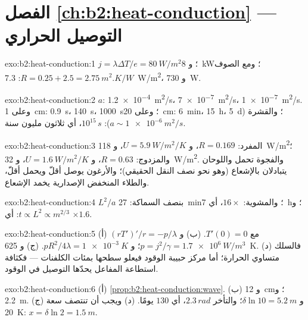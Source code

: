 \section*{الفصل \ref{ch:b2:heat-conduction} --- التوصيل الحراري}

\begin{solution}{exo:b2:heat-conduction:1}
$j = \lambda\Delta T/e = \qty{80}{W/m^2}$؛ و \qty{8}{kW}؛ ومع الصوف $R = 0.25 + 2.5 =
\qty{2.75}{m^2.K/W}$: \qty{7.3}{W/m^2}، و \qty{730}{W}.
\end{solution}

\begin{solution}{exo:b2:heat-conduction:2}
$a$: \qty{1.2e-4}{m^2/s}، \qty{7e-7}{m^2/s}، \qty{1e-7}{m^2/s}. وعلى \qty{1}{cm}:
\qty{0.9}{s}، \qty{140}{s}، \qty{1000}{s}؛ وعلى \qty{20}{cm}: \qty{6}{min}، \qty{15}{h}،
\qty{5}{d}؛ والقشرة ($a \sim \qty{1e-6}{m^2/s}$): $10^{15}\,\unit{s}$، أي ثلاثون
مليون سنة.
\end{solution}

\begin{solution}{exo:b2:heat-conduction:3}
المفرد: $R = 0.169$، و $U = \qty{5.9}{W/m^2/K}$، و \qty{118}{W/m^2}؛ والمزدوج: $R =
0.63$، و $U = \qty{1.6}{W/m^2/K}$، و \qty{32}{W/m^2}. والفجوة تحمل واللوحان
يتبادلان بالإشعاع (وهو نحو نصف النقل الحقيقي)؛ والأرغون يوصل
أقلّ ويحمل أقلّ، والطلاء المنخفض الإصدارية يخمد
الإشعاع.
\end{solution}

\begin{solution}{exo:b2:heat-conduction:4}
$L^2/a$ بنصف السماكة: \qty{27}{min}؛ والمشوية: $16\times$، أي \qty{7}{h}؛
و $t \propto L^2 \propto m^{2/3}$: أي $\times 1.6$.
\end{solution}

\begin{solution}{exo:b2:heat-conduction:5}
(أ) $(rT')'/r = -p/\lambda$ مع $T'(0) = 0$. (ب) و $p = j^2/\gamma = \qty{1.7e6}{W/m^3}$؛
و $pR^2/4\lambda = \qty{1e-3}{K}$. (ج) و \qty{625}{K}. (د) فالسلك متساوي الحرارة؛ أما
مركز حبيبة الوقود فيعلو سطحها بمئات الكلفنات --- فكثافة استطاعة
المفاعل يحدّها التوصيل في الوقود.
\end{solution}

\begin{solution}{exo:b2:heat-conduction:6}
(أ) \cref{prop:b2:heat-conduction:wave}. (ب) و \qty{12}{cm}؛ و \qty{2.2}{m}. (ج)
و $\delta\ln 10 = \qty{5.2}{m}$؛ والتأخر $2.3\,\unit{rad}$، أي $130$ يومًا. (د) ويجب أن تنتصف
سعة \qty{20}{K}: $x = \delta\ln 2 = \qty{1.5}{m}$.
\end{solution}

